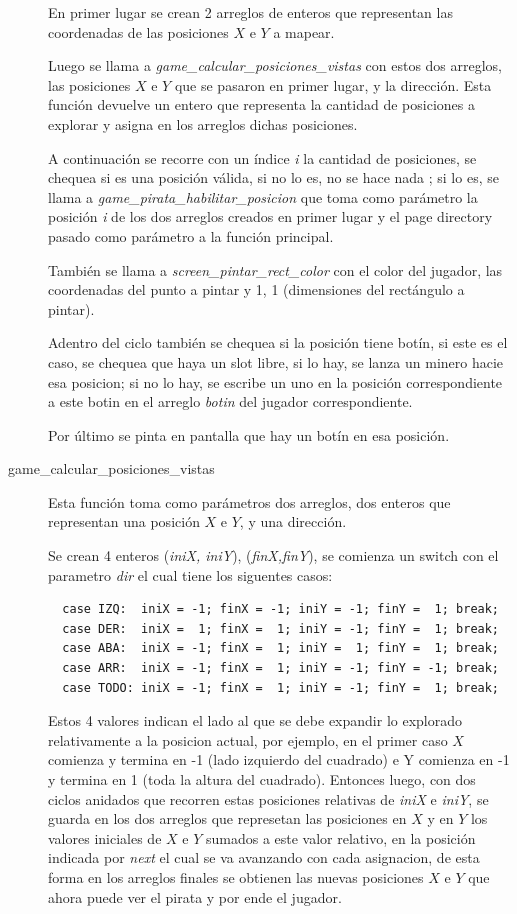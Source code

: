 \begin{description}
  En primer lugar se crean 2 arreglos de enteros que representan las coordenadas
  de las posiciones $X$ e $Y$ a mapear.

  Luego se llama a {\it game_calcular_posiciones_vistas\/} con estos dos
  arreglos, las posiciones $X$ e $Y$ que se pasaron en primer lugar, y la
  dirección.
  Esta función devuelve un entero que representa la cantidad de posiciones a
  explorar y asigna en los arreglos dichas posiciones.

  A continuación se recorre con un índice {\it i\/} la cantidad de posiciones,
  se chequea si es una posición válida, si no lo es, no se hace nada
  ; si lo es, se llama a {\it game_pirata_habilitar_posicion\/} que toma como
  parámetro la posición {\it i\/} de los dos arreglos creados en primer lugar y
  el page directory pasado como parámetro a la función principal.

  También se llama a {\it screen_pintar_rect_color\/} con el color del jugador,
  las coordenadas del punto a pintar y 1, 1 (dimensiones del rectángulo a
  pintar).

  Adentro del ciclo también se chequea si la posición tiene botín, si este es el
  caso, se chequea que haya un slot libre, si lo hay, se lanza un minero hacie
  esa posicion; si no lo hay, se escribe un uno en la posición correspondiente a
  este botin en el arreglo {\it botin\/} del jugador correspondiente.

  Por último se pinta en pantalla que hay un botín en esa posición.


\item[game_calcular_posiciones_vistas]
Esta función toma como parámetros dos arreglos, dos enteros que representan una
posición $X$ e $Y$, y una dirección.

Se crean 4 enteros ({\it iniX, iniY\/}), ({\it finX,finY\/}), se comienza un
switch con el parametro {\it dir\/} el cual tiene los siguentes casos:

\begin{lstlisting}
  case IZQ:  iniX = -1; finX = -1; iniY = -1; finY =  1; break;
  case DER:  iniX =  1; finX =  1; iniY = -1; finY =  1; break;
  case ABA:  iniX = -1; finX =  1; iniY =  1; finY =  1; break;
  case ARR:  iniX = -1; finX =  1; iniY = -1; finY = -1; break;
  case TODO: iniX = -1; finX =  1; iniY = -1; finY =  1; break;
\end{lstlisting}

Estos 4 valores indican el lado al que se debe expandir lo explorado
relativamente a la posicion actual, por ejemplo, en el primer caso $X$ comienza
y termina en -1 (lado izquierdo del cuadrado) e Y comienza en -1 y termina en 1
(toda la altura del cuadrado). Entonces luego, con dos ciclos anidados que
recorren estas posiciones relativas de {\it iniX\/} e {\it iniY\/}, se guarda en
los dos arreglos que represetan las posiciones en $X$ y en $Y$ los valores
iniciales de $X$ e $Y$ sumados a este valor relativo, en la posición indicada
por {\it next\/} el cual se va avanzando con cada asignacion, de esta forma en
los arreglos finales se obtienen las nuevas posiciones $X$ e $Y$ que ahora puede
ver el pirata y por ende el jugador.


\end{description}
